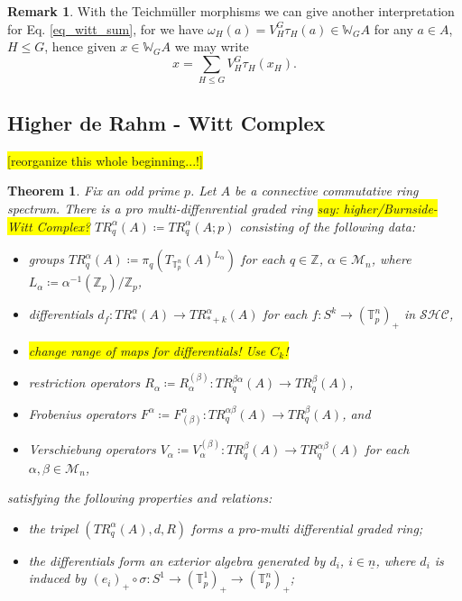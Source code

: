 \documentclass[10pt, a4paper, UKenglish]{article}
\numberwithin{equation}{section}
\newcommand{\cM}{\mathcal{M}}
\newcommand{\bW}{\mathbb{W}}
\newcommand{\bZ}{\mathbb{Z}}
\newcommand{\sT}{\mathbb{T}}		%
\newcommand{\defas}{\coloneqq}  %
\newcommand{\abs}[1]{\left\vert#1\right\vert}	%
\newcommand{\ind}[1]{\underline{#1}}
\newcommand{\SHC}{\mathcal{SHC}}
\newcommand{\comm}[1]{\colorbox{yellow}{#1}}
\theoremstyle{plain}
\newtheorem{thm}[equation]{Theorem}
\theoremstyle{definition}
\newtheorem{rem}[equation]{Remark}
\renewcommand{\to}{\longrightarrow}
\begin{document}
%
%
\begin{rem}\label{rem_teichmueller_sum}
With the Teichm\"uller morphisms we can give another interpretation for Eq. \ref{eq_witt_sum}, for we have $\omega_H (a) = V^G_H \tau_H (a) \in \bW_G A$ for any $a \in A$, $H \leq G$, hence given $x \in \bW_G A$ we may write
\begin{equation}\label{eq_witt_teichmueller_sum}
	x = \sum_{H \leq G} V_H^G \tau_H (x_H).
\end{equation}
\end{rem}
%
%
\subsection{Higher de Rahm - Witt Complex}
%
%
\comm{[reorganize this whole beginning...!]}
\begin{thm}\cite[Thm. 3.22]{carlsson2011higher}
Fix an odd prime $p$. Let $A$ be a connective commutative ring spectrum. There is a pro multi-diffenrential graded ring \comm{say: higher/Burnside-Witt Complex?} $TR_q^\alpha(A) \defas TR_q^\alpha(A;p)$ consisting of the following data:
\begin{itemize}
 \item groups $TR^\alpha_q(A) \defas \pi_q ( T_{\sT_p^n}(A)^{L_\alpha} )$ for each $q \in \bZ$, $\alpha \in \cM_n$, where $L_\alpha \defas \alpha^{-1}(\bZ_p) / \bZ_p$,
 \item differentials $d_f: TR^\alpha_*(A) \to TR^\alpha_{*+k}(A)$ for each $f : S^k \to (\sT_p^n)_+$ in $\SHC$,
 \item \colorbox{yellow}{change range of maps for differentials! Use $C_k$!}
 \item restriction operators $R_\alpha \defas R^{(\beta)}_\alpha: TR^{\beta\alpha}_q(A) \to TR^\beta_q(A)$,
 \item Frobenius operators $F^\alpha \defas F^\alpha_{(\beta)}: TR^{\alpha\beta}_q(A) \to TR^\beta_q(A)$, and
 \item Verschiebung operators $V_\alpha \defas V_\alpha^{(\beta)}: TR^\beta_q(A) \to TR^{\alpha\beta}_q(A)$ for each $\alpha,\beta \in \cM_n$,
\end{itemize}
satisfying the following properties and relations:
\begin{itemize}
 \item the tripel $(TR^\alpha_q(A),d,R)$ forms a pro-multi differential graded ring;
 \item the differentials form an exterior algebra generated by $d_i$, $i \in \ind{n}$, where $d_i$ is induced by  $(e_i)_+ \circ \sigma: S^1 \to (\sT^1_p)_+ \to (\sT_p^n)_+$;

\end{itemize}
\end{thm}
\end{document}

